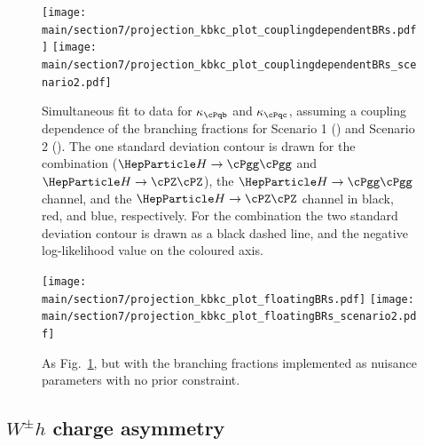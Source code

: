 \documentclass[../report.tex]{subfiles}
\providecommand{\main}{..}
\newcommand{\hboson}{\ensuremath{\PH}\xspace}
\newcommand{\bquark}{\ensuremath{\cPqb}\xspace}
\newcommand{\cquark}{\ensuremath{\cPqc}\xspace}
\newcommand{\zboson}{\ensuremath{\cPZ}\xspace}
\newcommand{\photon}{\ensuremath{\cPgg}\xspace}
\newcommand{\hgg}{\ensuremath{\hboson\to\photon\photon}\xspace}
\newcommand{\hzz}{\ensuremath{\hboson\to\zboson\zboson}\xspace}
\newcommand{\kappab}{\ensuremath{\kappa_{\bquark}}\xspace}
\newcommand{\kappac}{\ensuremath{\kappa_{\cquark}}\xspace}
\begin{document}
\begin{figure}[hbtp]
  \begin{center}
    \texttt{[image: \\main/section7/projection\_kbkc\_plot\_couplingdependentBRs.pdf]}
    \texttt{[image: \\main/section7/projection\_kbkc\_plot\_couplingdependentBRs\_scenario2.pdf]}
    \caption{
        Simultaneous fit to data for $\kappab$ and $\kappac$, assuming a coupling dependence of the branching fractions for Scenario 1 (\UcmsLeft) and Scenario 2 (\UcmsRight).
        The one standard deviation contour is drawn for the combination ($\hgg$ and $\hzz$), the $\hgg$ channel, and the $\hzz$ channel in black, red, and blue, respectively.
        For the combination the two standard deviation contour is drawn as a black dashed line, and the negative log-likelihood value on the coloured axis.
        }
    \label{fig:kbkc_couplingdependentBRs}
  \end{center}
\end{figure}

\begin{figure}[hbtp]
  \begin{center}
    \texttt{[image: \\main/section7/projection\_kbkc\_plot\_floatingBRs.pdf]}
    \texttt{[image: \\main/section7/projection\_kbkc\_plot\_floatingBRs\_scenario2.pdf]}
    \caption{
        As Fig.~\ref{fig:kbkc_couplingdependentBRs}, but with the branching fractions implemented as nuisance parameters with no prior constraint.
        }
    \label{fig:kbkc_floatingBRs}
  \end{center}
\end{figure}


\subsection{$W^\pm h$ charge asymmetry}
\end{document}
